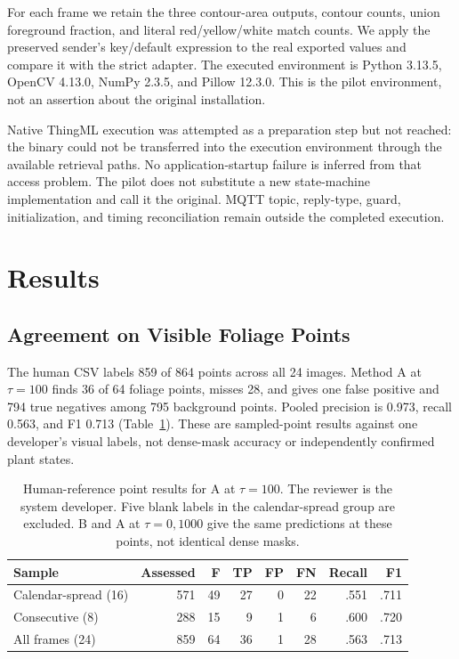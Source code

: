 \documentclass[runningheads]{llncs}
\begin{document}
For each frame we retain the three contour-area outputs, contour counts, union foreground fraction, and literal red/yellow/white match counts. We apply the preserved sender's key/default expression to the real exported values and compare it with the strict adapter. The executed environment is Python 3.13.5, OpenCV 4.13.0, NumPy 2.3.5, and Pillow 12.3.0. This is the pilot environment, not an assertion about the original installation.

Native ThingML execution was attempted as a preparation step but not reached: the binary could not be transferred into the execution environment through the available retrieval paths. No application-startup failure is inferred from that access problem. The pilot does not substitute a new state-machine implementation and call it the original. MQTT topic, reply-type, guard, initialization, and timing reconciliation remain outside the completed execution.

\section{Results}
\label{sec:results}
\subsection{Agreement on Visible Foliage Points}
The human CSV labels 859 of 864 points across all 24 images. Method A at $\tau=100$ finds 36 of 64 foliage points, misses 28, and gives one false positive and 794 true negatives among 795 background points. Pooled precision is 0.973, recall 0.563, and F1 0.713 (Table~\ref{tab:agreement}). These are sampled-point results against one developer's visual labels, not dense-mask accuracy or independently confirmed plant states.

\begin{table}[t]
\caption{Human-reference point results for A at $\tau=100$. The reviewer is the system developer. Five blank labels in the calendar-spread group are excluded. B and A at $\tau=0,1000$ give the same predictions at these points, not identical dense masks.}
\label{tab:agreement}
\centering
\small
\begin{tabular}{lrrrrrrr}
\toprule
Sample & Assessed & F & TP & FP & FN & Recall & F1\\
\midrule
Calendar-spread (16) & 571 & 49 & 27 & 0 & 22 & .551 & .711\\
Consecutive (8) & 288 & 15 & 9 & 1 & 6 & .600 & .720\\
All frames (24) & 859 & 64 & 36 & 1 & 28 & .563 & .713\\
\bottomrule
\end{tabular}
\end{table}
\end{document}
